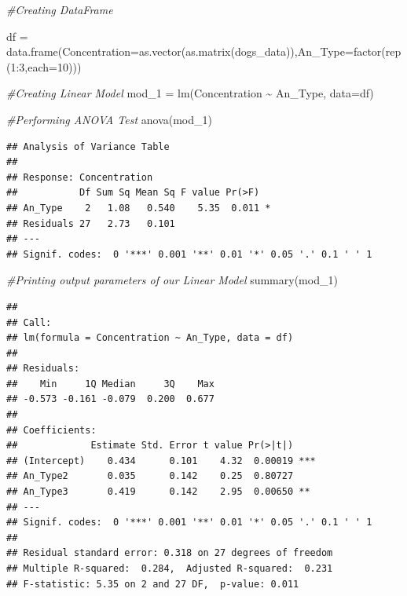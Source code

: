 \documentclass[
]{article}
\newenvironment{Shaded}{\begin{snugshade}}{\end{snugshade}}
\newcommand{\AttributeTok}[1]{\textcolor[rgb]{0.77,0.63,0.00}{#1}}
\newcommand{\CommentTok}[1]{\textcolor[rgb]{0.56,0.35,0.01}{\textit{#1}}}
\newcommand{\DecValTok}[1]{\textcolor[rgb]{0.00,0.00,0.81}{#1}}
\newcommand{\FunctionTok}[1]{\textcolor[rgb]{0.00,0.00,0.00}{#1}}
\newcommand{\NormalTok}[1]{#1}
\newcommand{\OtherTok}[1]{\textcolor[rgb]{0.56,0.35,0.01}{#1}}
\newcommand{\SpecialCharTok}[1]{\textcolor[rgb]{0.00,0.00,0.00}{#1}}
\begin{document}
\begin{Shaded}
\begin{Highlighting}[]
\CommentTok{\#Creating DataFrame}

\NormalTok{df }\OtherTok{=} \FunctionTok{data.frame}\NormalTok{(}\AttributeTok{Concentration=}\FunctionTok{as.vector}\NormalTok{(}\FunctionTok{as.matrix}\NormalTok{(dogs\_data)),}\AttributeTok{An\_Type=}\FunctionTok{factor}\NormalTok{(}\FunctionTok{rep}\NormalTok{(}\DecValTok{1}\SpecialCharTok{:}\DecValTok{3}\NormalTok{,}\AttributeTok{each=}\DecValTok{10}\NormalTok{)))}

\CommentTok{\#Creating Linear Model}
\NormalTok{mod\_1 }\OtherTok{=} \FunctionTok{lm}\NormalTok{(Concentration }\SpecialCharTok{\textasciitilde{}}\NormalTok{ An\_Type, }\AttributeTok{data=}\NormalTok{df)}

\CommentTok{\#Performing ANOVA Test}
\FunctionTok{anova}\NormalTok{(mod\_1)}
\end{Highlighting}
\end{Shaded}

\begin{verbatim}
## Analysis of Variance Table
## 
## Response: Concentration
##           Df Sum Sq Mean Sq F value Pr(>F)  
## An_Type    2   1.08   0.540    5.35  0.011 *
## Residuals 27   2.73   0.101                 
## ---
## Signif. codes:  0 '***' 0.001 '**' 0.01 '*' 0.05 '.' 0.1 ' ' 1
\end{verbatim}

\begin{Shaded}
\begin{Highlighting}[]
\CommentTok{\#Printing output parameters of our Linear Model}
\FunctionTok{summary}\NormalTok{(mod\_1)}
\end{Highlighting}
\end{Shaded}

\begin{verbatim}
## 
## Call:
## lm(formula = Concentration ~ An_Type, data = df)
## 
## Residuals:
##    Min     1Q Median     3Q    Max 
## -0.573 -0.161 -0.079  0.200  0.677 
## 
## Coefficients:
##             Estimate Std. Error t value Pr(>|t|)    
## (Intercept)    0.434      0.101    4.32  0.00019 ***
## An_Type2       0.035      0.142    0.25  0.80727    
## An_Type3       0.419      0.142    2.95  0.00650 ** 
## ---
## Signif. codes:  0 '***' 0.001 '**' 0.01 '*' 0.05 '.' 0.1 ' ' 1
## 
## Residual standard error: 0.318 on 27 degrees of freedom
## Multiple R-squared:  0.284,  Adjusted R-squared:  0.231 
## F-statistic: 5.35 on 2 and 27 DF,  p-value: 0.011
\end{verbatim}
\end{document}
